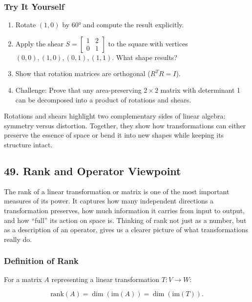 \documentclass[
  letterpaper,
  DIV=11,
  numbers=noendperiod]{scrreprt}
\providecommand{\tightlist}{%
  \setlength{\itemsep}{0pt}\setlength{\parskip}{0pt}}
\begin{document}
\subsubsection{Try It Yourself}\label{try-it-yourself-47}

\begin{enumerate}
\def\labelenumi{\arabic{enumi}.}
\tightlist
\item
  Rotate \((1,0)\) by 60° and compute the result explicitly.
\item
  Apply the shear \(S=\begin{bmatrix} 1 & 2 \\ 0 & 1 \end{bmatrix}\) to
  the square with vertices \((0,0),(1,0),(0,1),(1,1)\). What shape
  results?
\item
  Show that rotation matrices are orthogonal (\(R^TR=I\)).
\item
  Challenge: Prove that any area-preserving \(2\times2\) matrix with
  determinant 1 can be decomposed into a product of rotations and
  shears.
\end{enumerate}

Rotations and shears highlight two complementary sides of linear
algebra: symmetry versus distortion. Together, they show how
transformations can either preserve the essence of space or bend it into
new shapes while keeping its structure intact.

\subsection{49. Rank and Operator
Viewpoint}\label{rank-and-operator-viewpoint}

The rank of a linear transformation or matrix is one of the most
important measures of its power. It captures how many independent
directions a transformation preserves, how much information it carries
from input to output, and how ``full'' its action on space is. Thinking
of rank not just as a number, but as a description of an operator, gives
us a clearer picture of what transformations really do.

\subsubsection{Definition of Rank}\label{definition-of-rank-1}

For a matrix \(A\) representing a linear transformation \(T: V \to W\):

\[
\text{rank}(A) = \dim(\text{im}(A)) = \dim(\text{im}(T)).
\]
\end{document}
